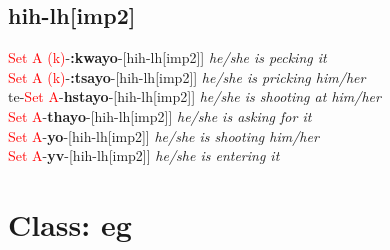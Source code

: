 \documentclass[oneside,openany]{book}%
\begin{document}
\subsection*{hih-lh[imp2]}%
\textcolor{Red}{Set A (k)}{-}\textbf{:kwayo}{-}[hih-lh[imp2]] \textit{ he/she is pecking it} \\%
\textcolor{Red}{Set A (k)}{-}\textbf{:tsayo}{-}[hih-lh[imp2]] \textit{ he/she is pricking him/her} \\%
te{-}\textcolor{Red}{Set A}{-}\textbf{hstayo}{-}[hih-lh[imp2]] \textit{ he/she is shooting at him/her} \\%
\textcolor{Red}{Set A}{-}\textbf{thayo}{-}[hih-lh[imp2]] \textit{ he/she is asking for it} \\%
\textcolor{Red}{Set A}{-}\textbf{yo}{-}[hih-lh[imp2]] \textit{ he/she is shooting him/her} \\%
\textcolor{Red}{Set A}{-}\textbf{yv}{-}[hih-lh[imp2]] \textit{ he/she is entering it} \\%
\vspace{1em}%
\needspace{3in}%
\section*{Class: eg}%
%
\needspace{1in}%
\end{document}
